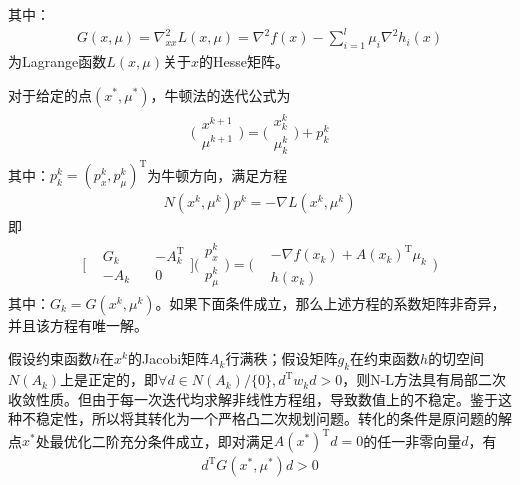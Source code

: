             其中：
            \begin{align*}
            G(x,\mu)={\nabla}_{xx}^2L(x,\mu)={\nabla}^2f(x)-\mathop {\sum}\limits_{i=1}^l{\mu}_i {\nabla}^2 h_i(x)
            \end{align*}
            为Lagrange函数$L(x,\mu)$关于$x$的Hesse矩阵。
            \par
            对于给定的点$(x^*,{\mu}^*)$，牛顿法的迭代公式为
            \begin{align*}
            \bigg(\begin{aligned}x^{k+1}\\{\mu}^{k+1}\end{aligned}\bigg)=\bigg(\begin{matrix}x_k^k\\
            {\mu}_k^k\end{matrix}\bigg)+p_k^k
            \end{align*}
            其中：$p_k^k=(p_x^k,p_{\mu}^k)^\mathrm{T} $为牛顿方向，满足方程
            \begin{align*}
            N(x^{k},{\mu}^k)p^k=-\nabla L(x^{k},{\mu}^k)
            \end{align*}
            即
            \begin{align*}
            \bigg[\begin{matrix}& G_k\quad & -A_k^\mathrm{T} \\
            & -A_k\quad & 0\end{matrix}\bigg]\bigg(\begin{matrix}p_x^k\\p_{\mu}^k\end{matrix}\bigg)=\bigg(\begin{matrix}& -\nabla f(x_k)+A(x_k)^\mathrm{T} {\mu}_k\\& h(x_k)\end{matrix}\bigg)
            \end{align*}
            其中：$G_k=G(x^k,{\mu}^k)$。如果下面条件成立，那么上述方程的系数矩阵非奇异，并且该方程有唯一解。
            \par
            假设约束函数$h$在$x^k$的Jacobi矩阵$A_k$行满秩；假设矩阵$g_k$在约束函数$h$的切空间$N(A_k)$上是正定的，即$\forall d \in N(A_k)/\{0\},d^\mathrm{T} w_kd>0$，则N-L方法具有局部二次收敛性质。但由于每一次迭代均求解非线性方程组，导致数值上的不稳定。鉴于这种不稳定性，所以将其转化为一个严格凸二次规划问题。转化的条件是原问题的解点$x^*$处最优化二阶充分条件成立，即对满足$A(x^*)^\mathrm{T} d=0$的任一非零向量$d$，有
            \begin{align*}
            d^\mathrm{T} G(x^*,{\mu}^*)d>0
            \end{align*}
